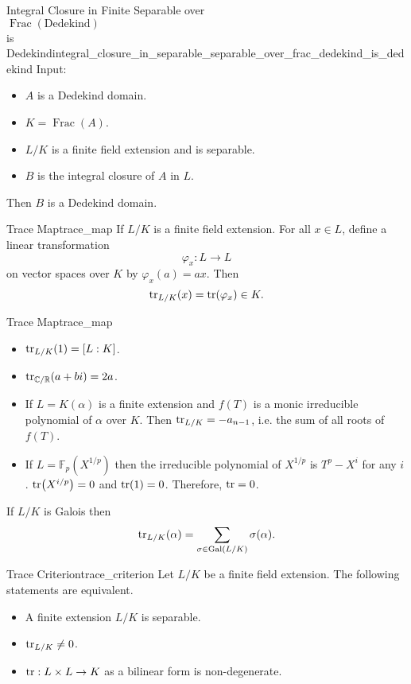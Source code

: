 \documentclass{article}
\begin{document}
\begin{theorem}{Integral Closure in Finite Separable over\\ $\operatorname{Frac}(\text{Dedekind})$ \\is Dedekind}{integral_closure_in_separable_separable_over_frac_dedekind_is_dedekind}
    Input:
    \begin{itemize}
        \item $A$ is a Dedekind domain.
        \item $K = \operatorname{Frac}(A)$.
        \item $L/K$ is a finite field extension and is separable.
        \item $B$ is the integral closure of $A$ in $L$.
    \end{itemize}
    Then $B$ is a Dedekind domain.
\end{theorem}

\begin{definition}{Trace Map}{trace_map}
    If $L/K$ is a finite field extension.
    For all $x\in L$, define a linear transformation
    \[ \varphi_x: L\rightarrow L \]
    on vector spaces over $K$ by $\varphi_x(a) = ax$.
    Then
    \[ \tr_{L/K}(x) = \tr(\varphi_x) \in K. \]
\end{definition}

\begin{example}{Trace Map}{trace_map}
    \begin{itemize}
        \item $\tr_{L/K}({1}) = [L:K]$.
        \item $\tr_{\mathbb{C}/\mathbb{R}}(a+bi) = 2a$.
        \item If $L = K(\alpha)$ is a finite extension and $f(T)$ is a monic irreducible polynomial of $\alpha$ over $K$.
        Then $\tr_{L/K} = -a_{n-1}$, i.e. the sum of all roots of $f(T)$.
        \item If $L = \mathbb{F}_p(X^{1/p})$ then the irreducible polynomial of $X^{1/p}$ is $T^p - X^i$ for any $i$.
        $\tr (X^{i/p}) = 0$ and $\tr(1) = 0$.
        Therefore, $\tr = 0$.
    \end{itemize}
\end{example}

If $L/K$ is Galois then
\[ \tr_{L/K}(\alpha) = \sum_{\sigma\in\operatorname{Gal}(L/K)} \sigma(\alpha). \]

\begin{proposition}{Trace Criterion}{trace_criterion}
    Let $L/K$ be a finite field extension.
    The following statements are equivalent.
    \begin{itemize}
        \item A finite extension $L/K$ is separable.
        \item $\tr_{L/K}\neq 0$.
        \item $\tr: L\times L \rightarrow K$ as a bilinear form is non-degenerate.
    \end{itemize}
\end{proposition}
\end{document}
